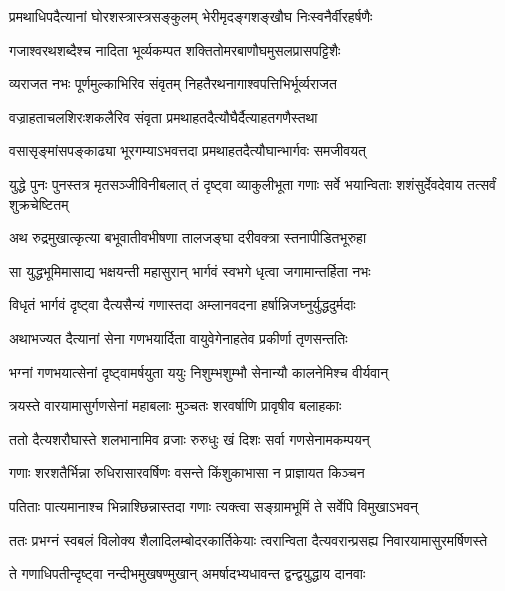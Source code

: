 \twolineshloka
{प्रमथाधिपदैत्यानां घोरशस्त्रास्त्रसङ्कुलम्}
{भेरीमृदङ्गशङ्खौघ निःस्वनैर्वीरहर्षणैः} %

\twolineshloka
{गजाश्वरथशब्दैश्च नादिता भूर्व्यकम्पत}
{शक्तितोमरबाणौघमुसलप्रासपट्टिशैः} %

\twolineshloka
{व्यराजत नभः पूर्णमुल्काभिरिव संवृतम्}
{निहतैरथनागाश्वपत्तिभिर्भूर्व्यराजत} %

\twolineshloka
{वज्राहताचलशिरःशकलैरिव संवृता}
{प्रमथाहतदैत्यौघैर्दैत्याहतगणैस्तथा} %

\twolineshloka
{वसासृङ्मांसपङ्काढ्या भूरगम्याऽभवत्तदा}
{प्रमथाहतदैत्यौघान्भार्गवः समजीवयत्} %

\threelineshloka
{युद्धे पुनः पुनस्तत्र मृतसञ्जीविनीबलात्}
{तं दृष्ट्वा व्याकुलीभूता गणाः सर्वे भयान्विताः}
{शशंसुर्देवदेवाय तत्सर्वं शुक्रचेष्टितम्} %

\twolineshloka
{अथ रुद्रमुखात्कृत्या बभूवातीवभीषणा}
{तालजङ्घा दरीवक्त्रा स्तनापीडितभूरुहा} %

\twolineshloka
{सा युद्धभूमिमासाद्य भक्षयन्ती महासुरान्}
{भार्गवं स्वभगे धृत्वा जगामान्तर्हिता नभः} %

\twolineshloka
{विधृतं भार्गवं दृष्ट्वा दैत्यसैन्यं गणास्तदा}
{अम्लानवदना हर्षान्निजघ्नुर्युद्धदुर्मदाः} %

\twolineshloka
{अथाभज्यत दैत्यानां सेना गणभयार्दिता}
{वायुवेगेनाहतेव प्रकीर्णा तृणसन्ततिः} %

\twolineshloka
{भग्नां गणभयात्सेनां दृष्ट्वामर्षयुता ययुः}
{निशुम्भशुम्भौ सेनान्यौ कालनेमिश्च वीर्यवान्} %


\twolineshloka
{त्रयस्ते वारयामासुर्गणसेनां महाबलाः}
{मुञ्चतः शरवर्षाणि प्रावृषीव बलाहकाः} %

\twolineshloka
{ततो दैत्यशरौघास्ते शलभानामिव व्रजाः}
{रुरुधुः खं दिशः सर्वा गणसेनामकम्पयन्} %

\twolineshloka
{गणाः शरशतैर्भिन्ना रुधिरासारवर्षिणः}
{वसन्ते किंशुकाभासा न प्राज्ञायत किञ्चन} %

\twolineshloka
{पतिताः पात्यमानाश्च भिन्नाश्छिन्नास्तदा गणाः}
{त्यक्त्वा सङ्ग्रामभूमिं ते सर्वेपि विमुखाऽभवन्} %

\twolineshloka
{ततः प्रभग्नं स्वबलं विलोक्य शैलादिलम्बोदरकार्तिकेयाः}
{त्वरान्विता दैत्यवरान्प्रसह्य निवारयामासुरमर्षिणस्ते} %





\twolineshloka
{ते गणाधिपतीन्दृष्ट्वा नन्दीभमुखषण्मुखान्}
{अमर्षादभ्यधावन्त द्वन्द्वयुद्धाय दानवाः} %

